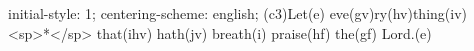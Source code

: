 initial-style: 1;
centering-scheme: english;
(c3)Let(e) eve(gv)ry(hv)thing(iv) <sp>*</sp> that(ihv) hath(jv) breath(i) praise(hf) the(gf) Lord.(e)
